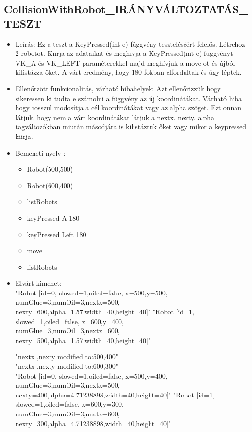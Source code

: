 \subsection{CollisionWithRobot\_IRÁNYVÁLTOZTATÁS\_TESZT}
\begin{itemize}
	\item Leírás: Ez a teszt a KeyPressed(int e) függvény teszteléséért felelős.
			Létrehoz 2 robotot.
			Kiirja az adataikat  és meghivja a KeyPressed(int e)  függvényt VK\_A és VK\_LEFT paraméterekkel majd meghívjuk a move-ot és újból kilistázza őket. A várt eredmény, hogy 180 fokban elfordultak és úgy léptek.			\newline
	\item Ellenőrzött funkcionalitás, várható hibahelyek: Azt ellenőrizzük hogy sikeressen ki tudta e számolni a függvény az új koordinátákat.
		Várható hiba hogy rosszul modosítja a cél koordinátákat vagy az alpha szöget. 
		Ezt onnan látjuk, hogy nem a várt koordinátákat látjuk a nextx, nexty, alpha tagváltozókban miután másodjára is kilistáztuk őket vagy mikor a keypressed kiirja.
	\item Bemeneti nyelv :
		\begin{itemize}
		\item Robot(500,500)
		\item Robot(600,400)
		\item listRobots
		\item keyPressed A 180 
		\item keyPressed Left 180
		\item move
		\item listRobots
		\end{itemize}
	
	\item Elvárt kimenet: \\
		"Robot [id=0,  slowed=1,oiled=false, x=500,y=500, 
		\\numGlue=3,numOil=3,nextx=500,
		\\nexty=600,alpha=1.57,width=40,height=40]"\newline
		"Robot [id=1,  slowed=1,oiled=false, x=600,y=400, 
		\\numGlue=3,numOil=3,nextx=600,
		\\nexty=500,alpha=1.57,width=40,height=40]"\newline
		
		"nextx ,nexty modified to:500,400"\\
		"nextx ,nexty modified to:600,300"\\

		"Robot [id=0,  slowed=1,oiled=false, x=500,y=400, 
		\\numGlue=3,numOil=3,nextx=500,
		\\nexty=400,alpha=4.71238898,width=40,height=40]"\newline
		"Robot [id=1,  slowed=1,oiled=false, x=600,y=300, 
		\\numGlue=3,numOil=3,nextx=600,
		\\nexty=300,alpha=4.71238898,width=40,height=40]"\newline
\end{itemize}

